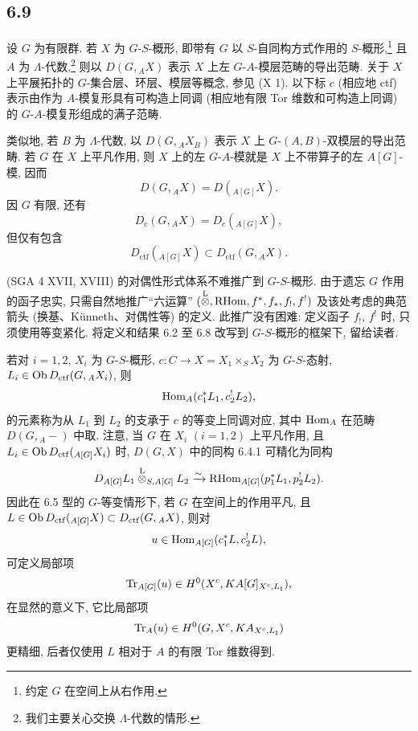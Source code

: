 \subsection*{6.9}
设 $G$ 为有限群. 若 $X$ 为 $G$-$S$-概形, 即带有 $G$ 以 $S$-自同构方式作用的 $S$-概形,\footnote{约定 $G$ 在空间上从右作用.} 且 $A$ 为 $\Lambda$-代数,\footnote{我们主要关心交换 $\Lambda$-代数的情形.} 则以 $D(G,{}_AX)$ 表示 $X$ 上左 $G$-$A$-模层范畴的导出范畴. 关于 $X$ 上平展拓扑的 $G$-集合层、环层、模层等概念, 参见 (X 1). 以下标 $c$ (相应地 ctf) 表示由作为 $A$-模复形具有可构造上同调 (相应地有限 Tor 维数和可构造上同调) 的 $G$-$A$-模复形组成的满子范畴.

类似地, 若 $B$ 为 $\Lambda$-代数, 以 $D(G,{}_AX_B)$ 表示 $X$ 上 $G$-$(A,B)$-双模层的导出范畴. 若 $G$ 在 $X$ 上平凡作用, 则 $X$ 上的左 $G$-$A$-模就是 $X$ 上不带算子的左 $A[G]$-模, 因而
\[
D(G,{}_AX)=D({}_{A[G]}X).
\]
因 $G$ 有限, 还有
\[
D_c(G,{}_AX)=D_c({}_{A[G]}X),
\]
但仅有包含
\[
D_{\mathrm{ctf}}({}_{A[G]}X)\subset D_{\mathrm{ctf}}(G,{}_AX).
\]

(SGA 4 XVII, XVIII) 的对偶性形式体系不难推广到 $G$-$S$-概形. 由于遗忘 $G$ 作用的函子忠实, 只需自然地推广``六运算'' $(\overset{\mathrm L}{\otimes},\mathrm{RHom},f^*,f_*,f_!,f^!)$ 及该处考虑的典范箭头 (换基、Künneth、对偶性等) 的定义. 此推广没有困难: 定义函子 $f_!$, $f^!$ 时, 只须使用等变紧化. 将定义和结果 6.2 至 6.8 改写到 $G$-$S$-概形的框架下, 留给读者.

若对 $i=1,2$, $X_i$ 为 $G$-$S$-概形, $c:C\to X=X_1\times_SX_2$ 为 $G$-$S$-态射, $L_i\in\operatorname{Ob} D_{\mathrm{ctf}}(G,{}_AX_i)$, 则
\[
\operatorname{Hom}_A(c_1^*L_1,c_2^!L_2),
\]
的元素称为从 $L_1$ 到 $L_2$ 的支承于 $c$ 的等变上同调对应, 其中 $\operatorname{Hom}_A$ 在范畴 $D(G,{}_A-)$ 中取. 注意, 当 $G$ 在 $X_i$ $(i=1,2)$ 上平凡作用, 且 $L_i\in\operatorname{Ob} D_{\mathrm{ctf}}({}_{A[G]}X_i)$ 时, $D(G,X)$ 中的同构 6.4.1 可精化为同构
\[
D_{A[G]}L_1\overset{\mathrm L}{\otimes}_{S,A[G]}L_2
\xrightarrow{\sim}
\mathrm{RHom}_{A[G]}(p_1^*L_1,p_2^!L_2).
\]
因此在 6.5 型的 $G$-等变情形下, 若 $G$ 在空间上的作用平凡, 且 $L\in\operatorname{Ob} D_{\mathrm{ctf}}({}_{A[G]}X)\subset D_{\mathrm{ctf}}(G,{}_AX)$, 则对
\[
u\in\operatorname{Hom}_{A[G]}(c_1^*L,c_2^!L),
\]
可定义局部项
\[
\operatorname{Tr}_{A[G]}(u)\in H^0(X^c,KA[G]_{X^c,L_{\natural}}),
\]
在显然的意义下, 它比局部项
\[
\operatorname{Tr}_A(u)\in H^0(G,X^c,KA_{X^c,L_{\natural}})
\]
更精细, 后者仅使用 $L$ 相对于 $A$ 的有限 Tor 维数得到.

